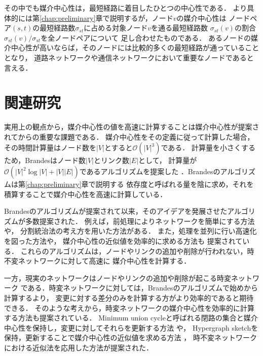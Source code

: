 その中でも媒介中心性\cite{Freeman1977}は，最短経路に着目したひとつの中心性である．
より具体的には第\ref{chap:preliminary}章で説明するが，ノード$v$の媒介中心性は
ノードペア$(s,t)$の最短経路数$\sigma_{st}$に占める対象ノード$v$を通る最短経路数
$\sigma_{st}(v)$の割合$\sigma_{st}(v)/\sigma_{st}$を全ノードペアについて
足し合わせたものである．
あるノードの媒介中心性が高いならば，そのノードには比較的多くの最短経路が通っていることとなり，
道路ネットワークや通信ネットワークにおいて重要なノードであると言える．

\section{関連研究}

実用上の観点から，媒介中心性の値を高速に計算することは媒介中心性が提案されてからの重要な課題である．
媒介中心性をその定義に従って計算した場合，
その時間計算量はノード数を$|V|$とすると$\mathcal{O}(|V|^3)$である．
計算量を小さくするため，Brandesはノード数$|V|$とリンク数$|E|$として，
計算量が$\mathcal{O}(|V|^2\log|V|+|V||E|)$であるアルゴリズムを提案した
\cite{Brandes2001}．Brandesのアルゴリズムは第\ref{chap:preliminary}章で説明する
依存度と呼ばれる量を陰に求め，それを積算することで媒介中心性を高速に計算している．

Brandesのアルゴリズムが提案されて以来，そのアイデアを発展させたアルゴリズムが多数提案された．
例えば，前処理によりネットワークを簡単にする方法\cite{Puzis2012,Bentert2018}や，
分割統治法の考え方を用いた方法\cite{Erdos2015}がある．
また，処理を並列に行い高速化を図った方法\cite{Bader2006,Tan2009,Edmonds2010,Bernaschi2016}や，
媒介中心性の近似値を効率的に求める方法\cite{Brandes2007,Bader2007,Pfeffer2012,Yoshida2014}も
提案されている．
これらのアルゴリズムは，ノードやリンクの追加や削除が行われない，時不変ネットワークに対して高速に
媒介中心性を計算する．

一方，現実のネットワークはノードやリンクの追加や削除が起こる時変ネットワーク\cite{Holme2012}
である．時変ネットワークに対しては，Brandesのアルゴリズムで始めから計算するより，
変更に対する差分のみを計算する方がより効率的であると期待できる．
そのような考えから，時変ネットワークの媒介中心性を効率的に計算する方法も提案されている．
Minimum union cycleと呼ばれる閉路の集合と媒介中心性を保持し，変更に対してそれらを更新する方法
\cite{Lee2012,Singh2015}や，
Hypergraph sketch\cite{Yoshida2014}を保持，更新することで媒介中心性の近似値を求める方法
\cite{Hayashi2015}，
時不変ネットワークにおける近似法を応用した方法\cite{Bergamini2015a,Bergamini2015b}が提案された．

